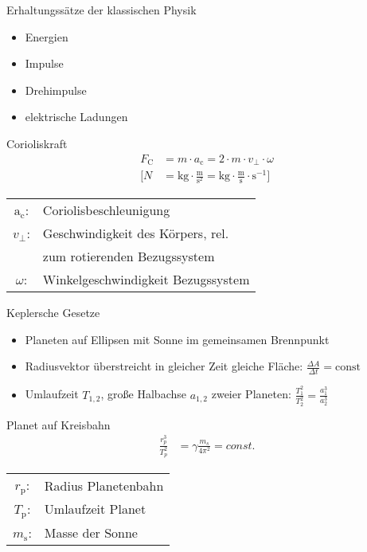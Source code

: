 \begin{karte}{Erhaltungssätze der klassischen Physik}
    \begin{itemize}
        \item Energien
        \item Impulse
        \item Drehimpulse
        \item elektrische Ladungen
    \end{itemize}
\end{karte}

\begin{karte}{Corioliskraft}
    \begin{align*}
        F_\text{C} &= m \cdot a_\text{c} = 2 \cdot m \cdot v_\bot \cdot \omega \\
        \bigg[ N &= \text{kg} \cdot \frac{\text{m}}{\text{s}^2} = \text{kg} \cdot \frac{\text{m}}{\text{s}} \cdot \text{s}^{-1} \bigg]
    \end{align*}
    \begin{tabular}[t]{cl}
        \(\text{a}_\text{c}\): & Coriolisbeschleunigung \\
        \(v_\bot\): & Geschwindigkeit des Körpers, rel. \\
            & zum rotierenden Bezugssystem \\
        \(\omega\): & Winkelgeschwindigkeit Bezugssystem
    \end{tabular}
\end{karte}

\begin{karte}{Keplersche Gesetze}
    \begin{itemize}
        \item Planeten auf Ellipsen mit Sonne im gemeinsamen Brennpunkt
        \item Radiusvektor überstreicht in gleicher Zeit gleiche Fläche: \(\frac{\Delta A}{\Delta t} = \text{const}\)
        \item Umlaufzeit \(T_{1,2}\), große Halbachse \(a_{1,2}\) zweier Planeten: \( \frac{T_1^2}{T_2^2} = \frac{a_1^3}{a_2^3} \)
    \end{itemize}
\end{karte}

\begin{karte}{Planet auf Kreisbahn}
    \begin{align*}
        \frac{r_p^3}{T_p^2} &= \gamma \frac{m_s}{4 \pi^2} = const.
    \end{align*}
    \begin{tabular}[t]{cl}
        \(r_\text{p}\): & Radius Planetenbahn \\
        \(T_\text{p}\): & Umlaufzeit Planet \\
        \(m_\text{s}\): & Masse der Sonne \\
    \end{tabular}
\end{karte}


